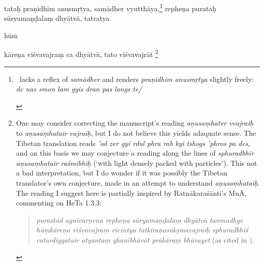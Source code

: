 \documentclass[naipra.tex]{subfiles}
\begin{document}
\begin{sanskrit}

\pstart
tataḥ praṇidhim anusmṛtya, samādher vyutthāya,\footnote{
	\begin{english}%
		\TIB\ lacks a reflex of \emph{samādher} and renders \emph{praṇidhim anusmṛtya} slightly freely: \emph{de nas smon lam gyis dran pas langs te/}
	\end{english}
} repheṇa purataḥ sūryamaṇḍalaṃ dhyātvā, tatratya\dsh \begin{mantra}hūṁ\end{mantra}\dsh kāreṇa viśvavajraṃ ca dhyātvā, tato viśvavajrāt \footnote{
	\begin{english}%
		One may consider correcting the manuscript's reading \emph{aṇusaṃhater vvajraiḥ} to \emph{aṇusaṃhatair vajraiḥ}, but I do not believe this yields adaquate sense.
		The Tibetan translation reads \emph{'od zer gyi rdul phra rab kyi tshogs 'phros pa des}, and on this basis we may conjecture a reading along the lines of \emph{sphuradbhir aṇusaṃhatair raśmibhiḥ} (`with light densely packed with particles'). 
		This not a bad interpretation, but I do wonder if it was possibly the Tibetan translator's own conjecture, made in an attempt to understand \emph{aṇusaṃhataiḥ}.
		The reading I suggest here is partially inspired by Ratnākaraśānti's MuĀ, commenting on HeTa 1.3.3:

		\begin{quote}
			\emph{purastād agnivarṇena repheṇa sūryamaṇḍalaṃ dhyātvā tanmadhye hūṃkāreṇa viśvavajraṃ vicintya tatkiraṇasūkṣmavajraiḥ sphuradbhiś caturdiggatair atyantaṃ ghanībhāvāt prākāraṃ bhāvayet} (as cited in \cite[293]{isaacson2007}).
		\end{quote}
	

\end{english}}
\end{sanskrit}
\end{document}
